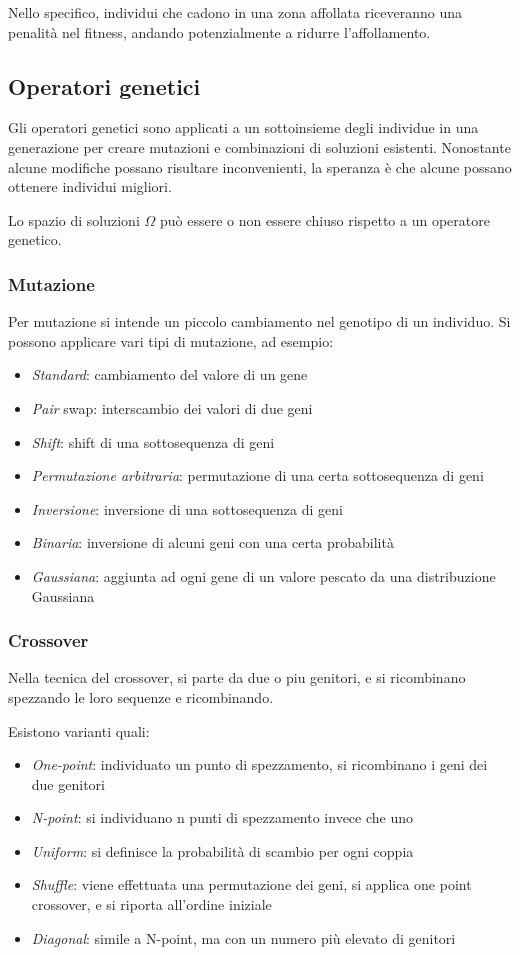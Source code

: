 \documentclass[a4paper]{article}
\begin{document}
Nello specifico, individui che cadono in una zona affollata riceveranno una penalità
nel fitness, andando potenzialmente a ridurre l'affollamento.

\subsection{Operatori genetici}
Gli operatori genetici sono applicati a un sottoinsieme degli individue in 
una generazione per creare mutazioni e combinazioni di soluzioni esistenti.
Nonostante alcune modifiche possano risultare inconvenienti, la speranza è che 
alcune possano ottenere individui migliori.

Lo spazio di soluzioni $\Omega$ può essere o non essere chiuso rispetto 
a un operatore genetico.

\subsubsection{Mutazione}
Per mutazione si intende un piccolo cambiamento nel genotipo di un individuo.
Si possono applicare vari tipi di mutazione, ad esempio:
\begin{itemize}
    \item \emph{Standard}: cambiamento del valore di un gene
    \item \emph{Pair} swap: interscambio dei valori di due geni
    \item \emph{Shift}: shift di una sottosequenza di geni
    \item \emph{Permutazione arbitraria}: permutazione di una certa sottosequenza di geni
    \item \emph{Inversione}: inversione di una sottosequenza di geni
    \item \emph{Binaria}: inversione di alcuni geni con una certa probabilità
    \item \emph{Gaussiana}: aggiunta ad ogni gene di un valore pescato da una distribuzione Gaussiana
\end{itemize}
\subsubsection{Crossover}
Nella tecnica del crossover, si parte da due o piu genitori, e si ricombinano 
spezzando le loro sequenze e ricombinando.

Esistono varianti quali:
\begin{itemize}
    \item \emph{One-point}: individuato un punto di spezzamento, si ricombinano i geni dei due genitori
    \item \emph{N-point}: si individuano n punti di spezzamento invece che uno
    \item \emph{Uniform}: si definisce la probabilità di scambio per ogni coppia
    \item \emph{Shuffle}: viene effettuata una permutazione dei geni, si applica one point crossover, 
    e si riporta all'ordine iniziale
    \item \emph{Diagonal}: simile a N-point, ma con un numero più elevato di genitori
\end{itemize}
\end{document}
